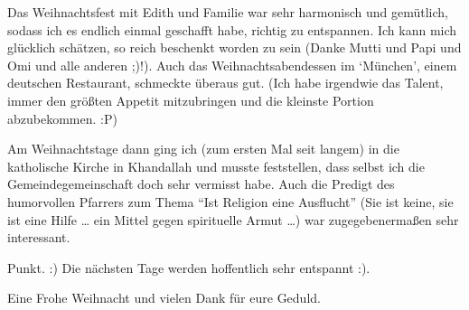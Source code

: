Das Weihnachtsfest mit Edith und Familie war sehr harmonisch und
gemütlich, sodass ich es endlich einmal geschafft habe, richtig zu
entspannen. Ich kann mich glücklich schätzen, so reich beschenkt worden
zu sein (Danke Mutti und Papi und Omi und alle anderen ;)!). Auch das
Weihnachtsabendessen im `München', einem deutschen Restaurant, schmeckte
überaus gut. (Ich habe irgendwie das Talent, immer den größten Appetit
mitzubringen und die kleinste Portion abzubekommen. :P)

Am Weihnachtstage dann ging ich (zum ersten Mal seit langem) in die
katholische Kirche in Khandallah und musste feststellen, dass selbst ich
die Gemeindegemeinschaft doch sehr vermisst habe. Auch die Predigt des
humorvollen Pfarrers zum Thema ``Ist Religion eine Ausflucht'' (Sie ist
keine, sie ist eine Hilfe \ldots{} ein Mittel gegen spirituelle Armut
\ldots) war zugegebenermaßen sehr interessant.

Punkt. :) Die nächsten Tage werden hoffentlich sehr entspannt :).

Eine Frohe Weihnacht und vielen Dank für eure Geduld.
